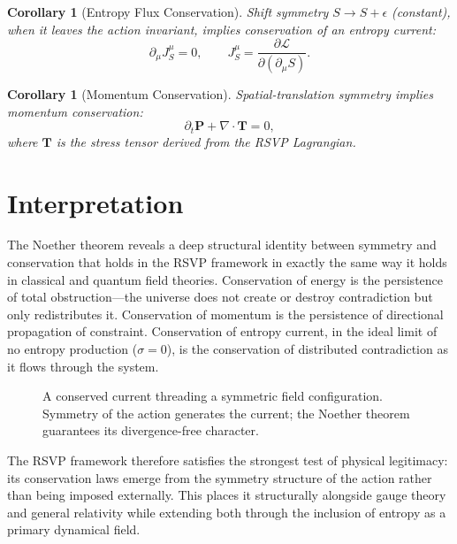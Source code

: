 \documentclass[12pt,a4paper,openany]{book}
\theoremstyle{plain}
\newtheorem{corollary}[theorem]{Corollary}
\theoremstyle{definition}
\theoremstyle{remark}
\newcommand{\RSVPContours}[2]{%
  \foreach \r in {0.45,0.90,1.35,1.80}{%
    \draw[rsvp scalar] (#1,#2) circle (\r);}}
\newcommand{\RSVPFlowRing}[3]{%
  \foreach \ang in {0,45,...,315}{%
    \draw[rsvp flow]
      ({#1 + #3*cos(\ang)},{#2 + #3*sin(\ang)})
      -- ++({-0.35*sin(\ang)},{0.35*cos(\ang)});}}
\begin{document}
\begin{corollary}[Entropy Flux Conservation]
Shift symmetry $S \to S + \epsilon$ (constant), when it leaves the action invariant, implies conservation of an entropy current:
\[
\partial_\mu J_S^\mu = 0, \qquad J_S^\mu = \frac{\partial\mathcal{L}}{\partial(\partial_\mu S)}.
\]
\end{corollary}

\begin{corollary}[Momentum Conservation]
Spatial-translation symmetry implies momentum conservation:
\[
\partial_t\mathbf{P} + \nabla\cdot\mathbf{T} = 0,
\]
where $\mathbf{T}$ is the stress tensor derived from the RSVP Lagrangian.
\end{corollary}

\section{Interpretation}

The Noether theorem reveals a deep structural identity between symmetry and conservation that holds in the RSVP framework in exactly the same way it holds in classical and quantum field theories. Conservation of energy is the persistence of total obstruction---the universe does not create or destroy contradiction but only redistributes it. Conservation of momentum is the persistence of directional propagation of constraint. Conservation of entropy current, in the ideal limit of no entropy production ($\sigma = 0$), is the conservation of distributed contradiction as it flows through the system.

\begin{figure}[h]
\centering
{}
\caption[Noether current]{A conserved current threading a symmetric field configuration. Symmetry of the action generates the current; the Noether theorem guarantees its divergence-free character.}
\label{fig:noether_current}
\end{figure}

The RSVP framework therefore satisfies the strongest test of physical legitimacy: its conservation laws emerge from the symmetry structure of the action rather than being imposed externally. This places it structurally alongside gauge theory and general relativity while extending both through the inclusion of entropy as a primary dynamical field.
\end{document}
